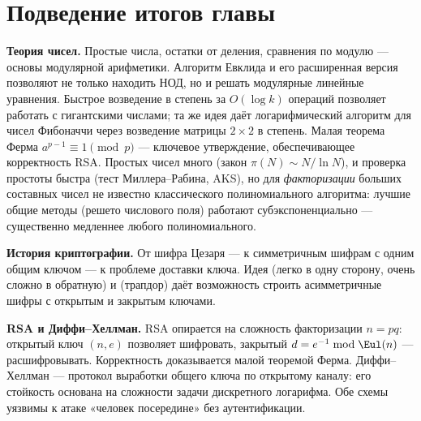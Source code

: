 \section*{Подведение итогов главы}

\begin{tcolorbox}[
  enhanced, sharp corners, boxrule=0pt,
  colback=prosvCream, leftrule=4pt, colframe=prosvBlue,
  left=12pt, right=12pt, top=10pt, bottom=10pt,
  before skip=0.5em, after skip=1.5em,
  title={\textbf{\color{prosvBlue}\large Главное в этой главе}},
  fonttitle=\bfseries
]
\textbf{Теория чисел.} Простые числа, остатки от деления, сравнения по модулю --- основы модулярной арифметики. Алгоритм Евклида и его расширенная версия позволяют не только находить НОД, но и решать модулярные линейные уравнения. Быстрое возведение в степень за $O(\log k)$ операций позволяет работать с гигантскими числами; та же идея даёт логарифмический алгоритм для чисел Фибоначчи через возведение матрицы $2{\times}2$ в степень. Малая теорема Ферма $a^{p-1} \equiv 1 \pmod p$ --- ключевое утверждение, обеспечивающее корректность RSA. Простых чисел много (закон $\pi(N) \sim N/\ln N$), и проверка простоты быстра (тест Миллера--Рабина, AKS), но для \emph{факторизации} больших составных чисел не известно классического полиномиального алгоритма: лучшие общие методы (решето числового поля) работают субэкспоненциально --- существенно медленнее любого полиномиального.

\textbf{История криптографии.} От шифра Цезаря --- к симметричным шифрам с одним общим ключом --- к проблеме доставки ключа. Идея  (легко в одну сторону, очень сложно в обратную) и  (трапдор) даёт возможность строить асимметричные шифры с открытым и закрытым ключами.

\textbf{RSA и Диффи--Хеллман.} RSA опирается на сложность факторизации $n = pq$: открытый ключ $(n, e)$ позволяет шифровать, закрытый $d = e^{-1} \bmod \Eul(n)$ --- расшифровывать. Корректность доказывается малой теоремой Ферма. Диффи--Хеллман --- протокол выработки общего ключа по открытому каналу: его стойкость основана на сложности задачи дискретного логарифма. Обе схемы уязвимы к атаке «человек посередине» без аутентификации.


\end{tcolorbox}
